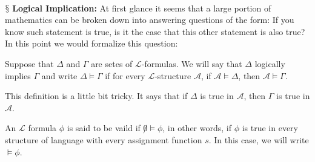 \documentclass[9pt,a4paper, twocolumn]{article}
\newcommand{\newpoint}[1]{\ \\ \indent$\mathsection$ \textbf{#1}}
\newcommand{\curveL}{\mathcal{L}}
\newcommand{\curveA}{\mathcal{A}}
\begin{document}
        \newpoint{Logical Implication: } 
                At first glance it seems that a large portion of mathematics can be broken down into answering questions of the form: If you know such statement is true, is it the case that this other statement is also true? In this point we would formalize this question:
                \begin{define}
                    Suppose that $\Delta$ and $\Gamma$ are setes of $\curveL$-formulas. We will say that $\Delta$ logically implies $\Gamma$ and write $\Delta\vDash\Gamma$ if for every $\curveL$-structure $\curveA$, if $\curveA\vDash\Delta$, then $\curveA\vDash\Gamma$.
                \end{define}
                This definition is a little bit tricky. It says that if $\Delta$ is true in $\curveA$, then $\Gamma$ is true in $\curveA$. 
                \begin{define}
                    An $\curveL$ formula $\phi$ is said to be vaild if $\not0\vDash\phi$, in other words, if $\phi$ is true in every structure of language with every assignment function $s$. In this case, we will write $\vDash \phi$.
                \end{define}
\end{document}
